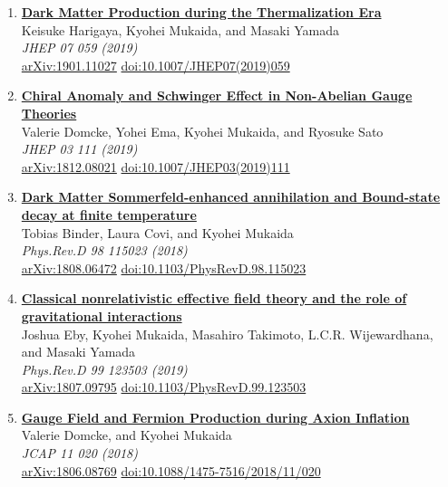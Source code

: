 \begin{enumerate}
\item \textbf{\href{https://arxiv.org/abs/1901.11027}{Dark Matter Production during the Thermalization Era}}\\
Keisuke Harigaya, Kyohei Mukaida, and Masaki Yamada\\
\emph{JHEP 07 059 (2019)}
\\ \href{https://arxiv.org/abs/1901.11027}{arXiv:1901.11027} \href{https://doi.org/10.1007/JHEP07(2019)059}{doi:10.1007/JHEP07(2019)059}

\item \textbf{\href{https://arxiv.org/abs/1812.08021}{Chiral Anomaly and Schwinger Effect in Non-Abelian Gauge Theories}}\\
Valerie Domcke, Yohei Ema, Kyohei Mukaida, and Ryosuke Sato\\
\emph{JHEP 03 111 (2019)}
\\ \href{https://arxiv.org/abs/1812.08021}{arXiv:1812.08021} \href{https://doi.org/10.1007/JHEP03(2019)111}{doi:10.1007/JHEP03(2019)111}

\item \textbf{\href{https://arxiv.org/abs/1808.06472}{Dark Matter Sommerfeld-enhanced annihilation and Bound-state decay at finite temperature}}\\
Tobias Binder, Laura Covi, and Kyohei Mukaida\\
\emph{Phys.Rev.D 98 115023 (2018)}
\\ \href{https://arxiv.org/abs/1808.06472}{arXiv:1808.06472} \href{https://doi.org/10.1103/PhysRevD.98.115023}{doi:10.1103/PhysRevD.98.115023}

\item \textbf{\href{https://arxiv.org/abs/1807.09795}{Classical nonrelativistic effective field theory and the role of gravitational interactions}}\\
Joshua Eby, Kyohei Mukaida, Masahiro Takimoto, L.C.R. Wijewardhana, and Masaki Yamada\\
\emph{Phys.Rev.D 99 123503 (2019)}
\\ \href{https://arxiv.org/abs/1807.09795}{arXiv:1807.09795} \href{https://doi.org/10.1103/PhysRevD.99.123503}{doi:10.1103/PhysRevD.99.123503}

\item \textbf{\href{https://arxiv.org/abs/1806.08769}{Gauge Field and Fermion Production during Axion Inflation}}\\
Valerie Domcke, and Kyohei Mukaida\\
\emph{JCAP 11 020 (2018)}
\\ \href{https://arxiv.org/abs/1806.08769}{arXiv:1806.08769} \href{https://doi.org/10.1088/1475-7516/2018/11/020}{doi:10.1088/1475-7516/2018/11/020}


\end{enumerate}
